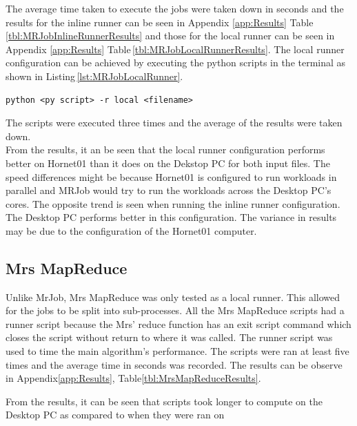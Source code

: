 \documentclass[10pt, twocolumn]{article}
\begin{document}
\noindent The average time taken to execute the jobs were taken down in seconds and the results for the inline runner can be seen in Appendix \ref*{app:Results} Table\,\ref{tbl:MRJobInlineRunnerResults} and those for the local runner can be seen in Appendix \ref*{app:Results} Table\,\ref{tbl:MRJobLocalRunnerResults}. The local runner configuration can be achieved by executing the python scripts in the terminal as shown in Listing\,\ref*{lst:MRJobLocalRunner}. 
\begin{center}
\begin{minipage}{0.95\columnwidth}
\begin{lstlisting}[style=bashStyle, label=lst:MRJobLocalRunner, caption = Command to execute MRJob python script in Local runner configuration]
python <py script> -r local <filename>
\end{lstlisting}
\end{minipage}
\end{center}
\noindent The scripts were executed three times and the average of the results were taken down.\\

 \noindent From the results, it an be seen that the local runner configuration performs better on Hornet01 than it does on the Dekstop PC for both input files. The speed differences might be because Hornet01 is configured to run workloads in parallel and MRJob would try to run the workloads across the Desktop PC's cores. The opposite trend is seen when running the inline runner configuration. The Desktop PC performs better in this configuration. The variance in results may be due to the configuration of the Hornet01 computer.
\subsection{Mrs MapReduce}
%
Unlike MrJob, Mrs MapReduce was only tested as a local runner. This allowed for the jobs to be split into sub-processes. All the Mrs MapReduce scripts had a runner script because the Mrs' reduce function has an exit script command which closes the script without return to where it was called. The runner script was used to time the main algorithm's performance. The scripts were ran at least five times and the average time in seconds was recorded. The results can be observe in Appendix\;\;\ref*{app:Results}, Table\;\;\ref{tbl:MrsMapReduceResults}.

From the results, it can be seen that scripts took longer to compute on the Desktop PC as compared to when they were ran on 
%
\end{document}
